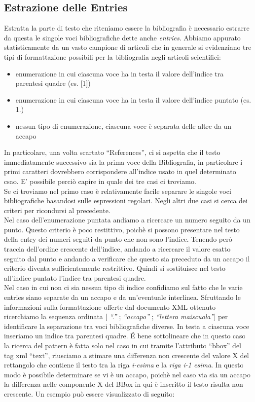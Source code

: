 \subsection{Estrazione delle Entries}
Estratta la parte di testo che riteniamo essere la bibliografia è necessario estrarre da questa le singole voci bibliografiche dette anche \textit{entries}. Abbiamo appurato statisticamente da un vasto campione di articoli che in generale si evidenziano tre tipi di formattazione possibili per la bibliografia negli articoli scientifici:
\begin{itemize}
 \item enumerazione in cui ciascuna voce ha in testa il valore dell'indice tra parentesi quadre (es. [1])
 \item enumerazione in cui ciascuna voce ha in testa il valore dell'indice puntato (es.  1.)
 \item nessun tipo di enumerazione, ciascuna voce è separata delle altre da un accapo
\end{itemize}
In particolare, una volta scartato ``References'', ci si aspetta che il testo immediatamente successivo sia la prima voce della Bibliografia, in particolare i primi caratteri dovrebbero corrispondere all'indice usato in quel determinato csao. E' possibile perciò capire in quale dei tre casi ci troviamo.
\\
Se ci troviamo nel primo caso è relativamente facile separare le singole voci bibliografiche basandosi sulle espressioni regolari. Negli altri due casi si cerca dei criteri per ricondursi al precedente.
\\
Nel caso dell'enumerazione puntata andiamo a ricercare un numero seguito da un punto. Questo criterio è poco restittivo, poichè si possono presentare nel testo della entry dei numeri seguiti da punto che non sono l'indice. Tenendo però traccia dell'ordine crescente dell'indice, andando a ricercare il valore esatto seguito dal punto e andando a verificare che questo sia preceduto da un accapo il criterio diventa sufficientemente restrittivo. Quindi si sostituisce nel testo all'indice puntato l'indice tra parentesi quadre.
\\
Nel caso in cui non ci sia nessun tipo di indice confidiamo sul fatto che le varie entries siano separate da un accapo e da un'eventuale interlinea. Sfruttando le informazioni sulla formattazione offerte dal documento XML ottenuto ricerchiamo la sequenza ordinata [ \textit{``.''} ; \textit{``accapo''} ; \textit{``lettera maiscuola''}] per identificare la separazione tra voci bibliografiche diverse. In testa a ciascuna voce inseriamo un indice tra parentesi quadre. \'E bene sottolineare che in questo caso la ricerca del pattern è fatta solo nel caso in cui tramite l'attributo ``bbox'' del tag xml ``text'', riusciamo a stimare una differenza non crescente del valore X del rettangolo che contiene il testo tra la riga \textit{i-esima} e la \textit{riga i-1 esima}. In questo modo è possibile determinare se vi è un accapo, poichè nel caso via sia un accapo la differenza nelle componente X del BBox in qui è inscritto il testo risulta non crescente. Un esempio può essere visualizzato di seguito:


